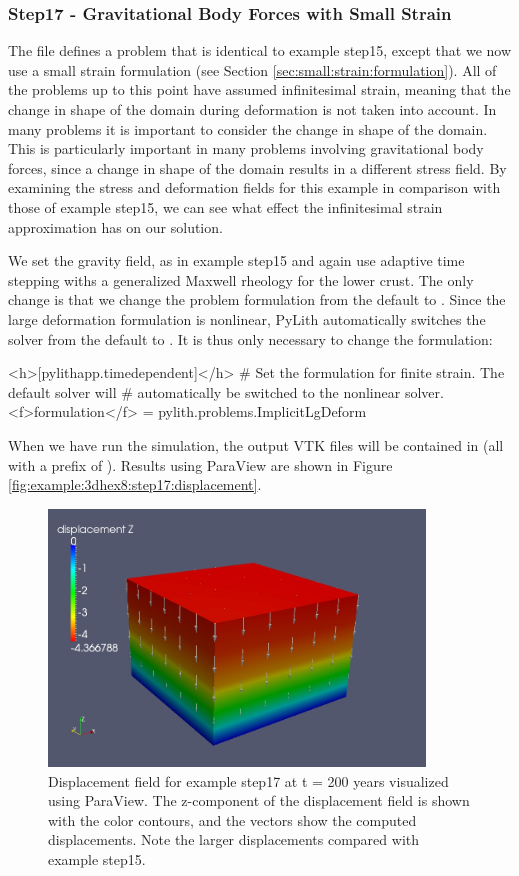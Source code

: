 \subsubsection{Step17 - Gravitational Body Forces with Small Strain}

The  file defines a problem that is identical to
example step15, except that we now use a small strain formulation
(see Section \vref{sec:small:strain:formulation}). All of the problems
up to this point have assumed infinitesimal strain, meaning that the
change in shape of the domain during deformation is not taken into
account. In many problems it is important to consider the change in
shape of the domain. This is particularly important in many problems
involving gravitational body forces, since a change in shape of the
domain results in a different stress field. By examining the stress
and deformation fields for this example in comparison with those of
example step15, we can see what effect the infinitesimal strain approximation
has on our solution.

We set the gravity field, as in example step15 and again use adaptive
time stepping withs a generalized Maxwell rheology for the lower crust.
The only change is that we change the problem formulation from the
default  to . Since the
large deformation formulation is nonlinear, PyLith automatically switches
the solver from the default  to .
It is thus only necessary to change the formulation:
\begin{cfg}
<h>[pylithapp.timedependent]</h>
# Set the formulation for finite strain. The default solver will
# automatically be switched to the nonlinear solver.
<f>formulation</f> = pylith.problems.ImplicitLgDeform
\end{cfg}
When we have run the simulation, the output VTK files will be contained
in  (all with a prefix of ).
Results using ParaView are shown in Figure \vref{fig:example:3dhex8:step17:displacement}.

\begin{figure}
  \includegraphics[width=10cm]{examples/figs/3dhex8_step17-displ-t200}
  \caption{Displacement field for example step17 at t = 200 years visualized
    using ParaView. The z-component of the displacement field is shown
    with the color contours, and the vectors show the computed displacements.
    Note the larger displacements compared with example step15.}
  \label{fig:example:3dhex8:step17:displacement}
\end{figure}

